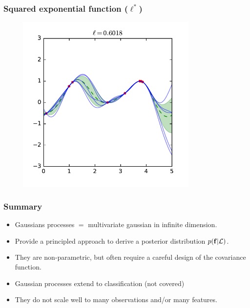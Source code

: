 \documentclass{beamer}
\begin{document}
\begin{frame}
    \frametitle{Squared exponential function ($\ell^*$)}

    \begin{figure}
        \centering
        \includegraphics[width=0.8\textwidth]{./figures/rbf-ml.pdf}
    \end{figure}
\end{frame}

\begin{frame}
    \frametitle{Summary}

    \begin{itemize}
        \item Gaussians processes $=$ multivariate gaussian in infinite dimension.
        \item Provide a principled approach to derive a posterior distribution $p(\mathbf{f}|{\cal L})$.
        \item They are non-parametric, but often require a careful design of the covariance function.
        \item Gaussian processes extend to classification (not covered)
        \item They do not scale well to many observations and/or many features.
    \end{itemize}
\end{frame}
\end{document}
